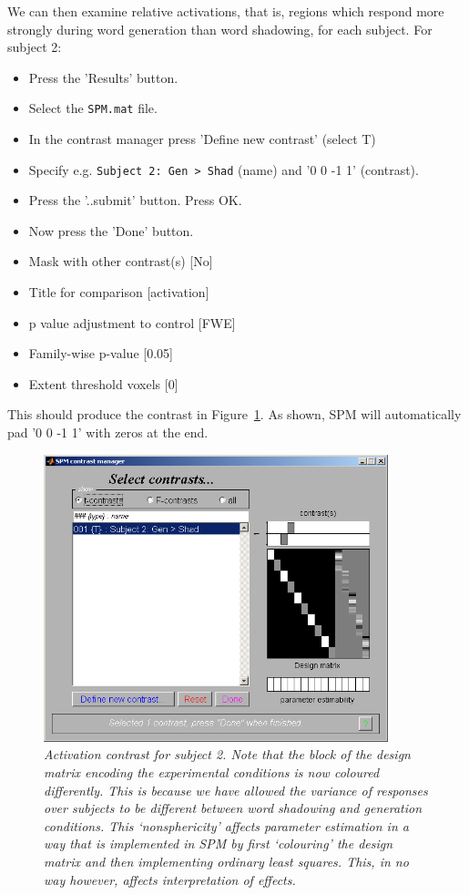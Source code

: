 We can then examine relative activations, that is, regions which respond more strongly during word generation than word shadowing, for each subject. For subject 2:
\begin{itemize}
\item{Press the 'Results' button.}
\item{Select the \texttt{SPM.mat} file.}
\item{In the contrast manager press 'Define new contrast' (select T)}
\item{Specify e.g. \verb!Subject 2: Gen > Shad! (name) and '0 0 -1 1' (contrast).}
\item{Press the '..submit' button. Press OK.}
\item{Now press the 'Done' button.}
\item{Mask with other contrast(s) [No]}
\item{Title for comparison [activation]}
\item{p value adjustment to control [FWE]}
\item{Family-wise p-value [0.05]}
\item{Extent threshold {voxels} [0]}
\end{itemize}
This should produce the contrast in Figure~\ref{subject2}. As shown, SPM will automatically pad '0 0 -1 1' with zeros
at the end.
\begin{figure}
\begin{center}
\includegraphics[width=100mm]{pet/subject2}
\caption{\em Activation contrast for subject 2. Note that the block of the design matrix encoding the experimental conditions is now coloured differently. This is because we have allowed the variance of responses over subjects to be different between word shadowing and generation conditions. This `nonsphericity' affects parameter estimation in a way that is implemented in SPM by first `colouring' the design matrix and then implementing ordinary least squares. This, in no way however, affects interpretation of effects.  \label{subject2}}
\end{center}
\end{figure}
